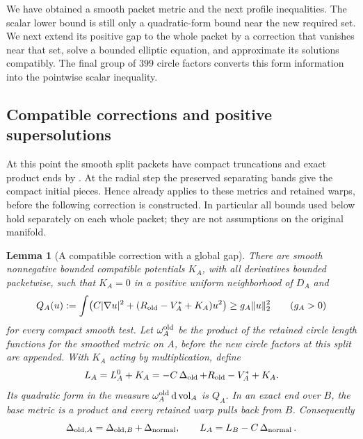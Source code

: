\documentclass[11pt]{article}
\numberwithin{equation}{section}
\newtheorem{lemma}[theorem]{Lemma}
\theoremstyle{definition}
\theoremstyle{remark}
\begin{document}
We have obtained a smooth packet metric and the next profile
inequalities. The scalar lower bound is still only a quadratic-form
bound near the new required set. We next extend its positive gap to
the whole packet by a correction that vanishes near that set, solve a
bounded elliptic equation, and approximate its solutions compatibly.
The final group of $399$ circle factors converts this form information
into the pointwise scalar inequality.

\subsection{Compatible corrections and positive supersolutions}

At this point the smooth split packets have compact truncations and
exact product ends by .  At the radial step the
preserved separating bands give the compact initial pieces.  Hence
 already applies to these metrics and retained
warps, before the following correction is constructed.  In particular
all bounds used below hold separately on each whole packet; they are
not assumptions on the original manifold.

\begin{lemma}[A compatible correction with a global gap]\label{regular:correction}
There are smooth nonnegative bounded compatible potentials $K_A$,
with all derivatives bounded packetwise, such that $K_A=0$ in a
positive uniform neighborhood of $D_A$ and
\begin{equation}\label{regular:global-gap}
 Q_A(u):=\int\bigl(C|\nabla u|^2+
       (R_{\rm old}-V_A^*+K_A)u^2\bigr)
 \ge g_A\|u\|_2^2\qquad(g_A>0)
\end{equation}
for every compact smooth test.
Let $\omega_A^{\rm old}$ be the product of the retained circle length
functions for the smoothed metric on $A$, before the new circle
factors at this split are appended.  With $K_A$ acting by
multiplication, define
\[
 L_A=L_A^0+K_A
     =-C\operatorname{\Delta}_{\rm old}+R_{\rm old}-V_A^*+K_A.
\]
Its quadratic form in the measure
$\omega_A^{\rm old}\,\mathrm d\operatorname{vol}_A$ is $Q_A$.
In an exact end over $B$, the base metric is a product and every
retained warp pulls back from $B$.  Consequently
\[
 \operatorname{\Delta}_{{\rm old},A}=\operatorname{\Delta}_{{\rm old},B}+\operatorname{\Delta}_{\rm normal},
 \qquad L_A=L_B-C\operatorname{\Delta}_{\rm normal}.
\]
\end{lemma}
\end{document}
